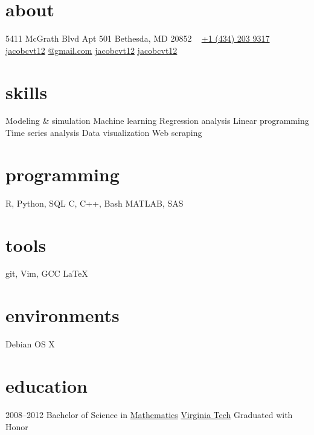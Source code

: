 \documentclass[]{friggeri-cv} %
\begin{document}



\begin{aside} %
\section{about}
5411 McGrath Blvd
Apt 501
Bethesda, MD 20852
~
\href{tel:14342039317}{\faPhone +1 (434) 203 9317}
\href{mailto:jacobcvt12@gmail.com}{\faEnvelope jacobcvt12}
\href{mailto:jacobcvt12@gmail.com}{@gmail.com}
\href{https://github.com/jacobcvt12}{\faGithub jacobcvt12}
\href{https://www.linkedin.com/in/jacobcvt12}{\faLinkedin jacobcvt12}
\section{skills}
Modeling \& simulation
Machine learning
Regression analysis
Linear programming
Time series analysis
Data visualization
Web scraping
\section{programming}
R, Python, SQL
C, C++, Bash
MATLAB, SAS
\section{tools}
git, Vim, GCC
\LaTeX
\section{environments}
Debian
OS X
\end{aside}


\section{education}

\begin{entrylist}
\entry
{2008--2012}
{Bachelor {\normalfont of Science in}
\href{https://www.math.vt.edu/}{Mathematics}}
{\href{http://www.vt.edu}{Virginia Tech}}
{Graduated with Honor}
\end{entrylist}
\end{document}
